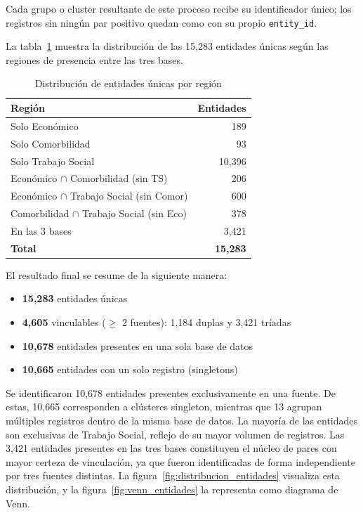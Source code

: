 Cada grupo o cluster resultante de este proceso recibe su identificador único; los registros sin ningún par positivo quedan como  con su propio \texttt{entity\_id}.

La tabla~\ref{tab:distribucion_entidades} muestra la distribución de las 15,283 entidades únicas según las regiones de presencia entre las tres bases.

\begin{table}[H]
\centering
\small
\caption{Distribución de entidades únicas por región}
\label{tab:distribucion_entidades}
\begin{tabular}{lr}
\toprule
\textbf{Región} & \textbf{Entidades} \\
\midrule
Solo Económico                              &    189 \\
Solo Comorbilidad                           &     93 \\
Solo Trabajo Social                         & 10,396 \\
Económico $\cap$ Comorbilidad (sin TS)      &    206 \\
Económico $\cap$ Trabajo Social (sin Comor) &    600 \\
Comorbilidad $\cap$ Trabajo Social (sin Eco)&    378 \\
En las 3 bases                              &  3,421 \\
\midrule
\textbf{Total}                              & \textbf{15,283} \\
\bottomrule
\end{tabular}
\end{table}

El resultado final se resume de la siguiente manera:
\begin{itemize}
    \item \textbf{15,283} entidades únicas
    \item \textbf{4,605} vinculables ($\geq$ 2 fuentes): 1,184 duplas y 3,421 tríadas
    \item \textbf{10,678} entidades presentes en una sola base de datos
    \item \textbf{10,665} entidades con un solo registro (singletons)
\end{itemize}

Se identificaron 10,678 entidades presentes exclusivamente en una fuente. De estas, 10,665 corresponden a clústeres singleton, mientras que 13 agrupan múltiples registros dentro de la misma base de datos.
La mayoría de las entidades son exclusivas de Trabajo Social, reflejo de su mayor volumen de registros. Las 3,421 entidades presentes en las tres bases constituyen el núcleo de pares con mayor certeza de vinculación, ya que fueron identificadas de forma independiente por tres fuentes distintas. La figura~\ref{fig:distribucion_entidades} visualiza esta distribución, y la figura~\ref{fig:venn_entidades} la representa como diagrama de Venn.


